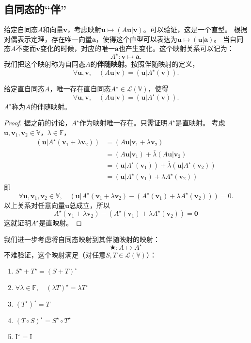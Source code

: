 \documentclass[12pt,UTF8]{ctexbook}
\begin{document}
\subsection{自同态的“伴”}
给定自同态$A$和向量$\mathbf{v}$，考虑映射$\mathbf{u} \mapsto (A\mathbf{u} | \mathbf{v})$。可以验证，这是一个直型。
根据对偶表示定理，存在唯一向量$\mathbf{a}$，使得这个直型可以表达为$\mathbf{u} \mapsto (\mathbf{u} | \mathbf{a})$。
当自同态$A$不变而$\mathbf{v}$变化的时候，对应的唯一$\mathbf{a}$也产生变化。这个映射关系可以记为：
$$ A^\star : \mathbf{v} \mapsto \mathbf{a}. $$
我们把这个映射称为自同态$A$的\textbf{伴随映射}。按照伴随映射的定义，
$$ \forall \mathbf{u}, \mathbf{v}, \quad (A\mathbf{u} | \mathbf{v}) = (\mathbf{u} | A^\star(\mathbf{v})). $$
\begin{pp}\label{pp:8_3}
    给定直自同态$A$，唯一存在直自同态$A^\star \in \mathcal{L}(\mathbb{V})$，使得
    $$ \forall \mathbf{u}, \mathbf{v}, \quad (A\mathbf{u} | \mathbf{v}) = (\mathbf{u} | A^\star(\mathbf{v})). $$
    $A^\star$称为$A$的伴随映射。
\end{pp}
\begin{proof} %
    据之前的讨论，$A^\star$作为映射唯一存在。只需证明$A^\star$是直映射。
    考虑$\mathbf{u}, \mathbf{v}_1, \mathbf{v}_2 \in \mathbb{V}$，$\lambda \in \mathbb{F}$，
    \begin{align*}
        (\mathbf{u} | A^\star(\mathbf{v}_1 + \lambda \mathbf{v}_2)) &= (A\mathbf{u} | \mathbf{v}_1 + \lambda \mathbf{v}_2)  \\
        &= (A\mathbf{u} | \mathbf{v}_1) + \overline{\lambda} (A\mathbf{u} | \mathbf{v}_2)  \\
        &= (\mathbf{u} | A^\star(\mathbf{v}_1)) + \overline{\lambda} (\mathbf{u} | A^\star(\mathbf{v}_2))  \\
        &= (\mathbf{u} | A^\star(\mathbf{v}_1) + \lambda A^\star(\mathbf{v}_2)) 
    \end{align*}
    即
    $$ \forall \mathbf{u}, \mathbf{v}_1, \mathbf{v}_2 \in \mathbb{V}, \quad (\mathbf{u} | A^\star(\mathbf{v}_1 + \lambda \mathbf{v}_2) - (A^\star(\mathbf{v}_1) + \lambda A^\star(\mathbf{v}_2))) = 0.$$
    以上关系对任意向量$\mathbf{u}$总成立，所以
    $$ A^\star(\mathbf{v}_1 + \lambda \mathbf{v}_2) - (A^\star(\mathbf{v}_1) + \lambda A^\star(\mathbf{v}_2)) = \mathbf{0} $$
    这就证明$A^\star$是直映射。

\end{proof}


我们进一步考虑将自同态映射到其伴随映射的映射：
$$ \bigstar : A \mapsto A^\star $$
不难验证，这个映射满足（对任意$S, T \in \mathcal{L}(\mathbb{V})$）：
\begin{enumerate}
    \item $S^\star + T^\star = (S + T)^\star$
    \item $\forall \lambda \in \mathbb{F}, \quad (\lambda T)^\star = \overline{\lambda} T^\star$
    \item $ (T^\star)^\star = T $
    \item $ (T\circ S)^\star = S^\star \circ T^\star$
    \item $ \mathrm{I}^\star = \mathrm{I}$
\end{enumerate}
\end{document}
